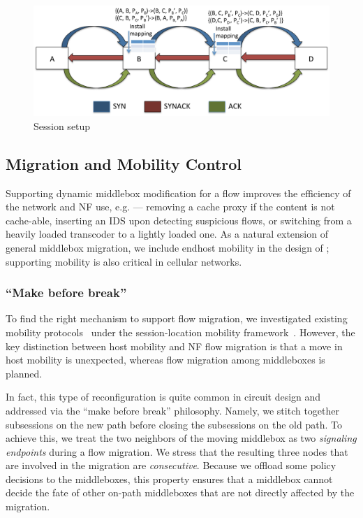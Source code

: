 \begin{figure}[ht]
\centering
\includegraphics[width=\linewidth]{figures/threeway.pdf} 

\caption{\small  Session setup}\label{sessionsetup}
\end{figure}



\subsection{Migration and Mobility Control}\label{MigrateLogic}

Supporting dynamic middlebox modification for a flow improves the efficiency of the network and NF use, e.g. --- removing a cache proxy if the content is not cache-able, inserting an IDS upon detecting suspicious flows, or switching from a heavily loaded transcoder to a lightly loaded one. As a natural extension of general middlebox migration, we include endhost mobility in the design of \system; supporting mobility is also critical in cellular networks.

\subsubsection{``Make before break''} \label{migration1}
To find the right mechanism to support flow migration, we investigated existing mobility protocols~\cite{TCPMobile, I3Mobile, mip, serval, lisp, hip} under the session-location mobility framework~\cite{zave}. However, the key distinction between host mobility and NF flow migration is that a move in host mobility is unexpected, whereas flow migration among middleboxes is planned.

In fact, this type of reconfiguration is quite common in circuit design and addressed via the ``make before break'' philosophy. Namely, we stitch together subsessions on the new path before closing the subsessions on the old path. To achieve this, we treat the two neighbors of the moving middlebox as two \textit{signaling endpoints} during a flow migration. We stress that the resulting three nodes that are involved in the migration are \textit{consecutive}. Because we offload some policy decisions to the middleboxes, this property ensures that a middlebox cannot decide the fate of other on-path middleboxes that are not directly affected by the migration. 

